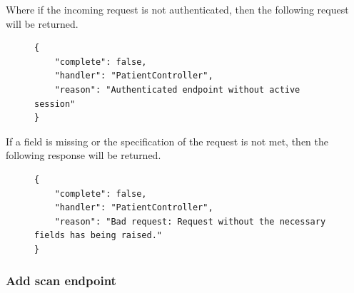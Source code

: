 					Where if the incoming request is not authenticated, then the following request will be returned.
					\begin{figure}[H]
						\iftrue
						\begin{lstlisting}[]
{
	"complete": false,
	"handler": "PatientController",
	"reason": "Authenticated endpoint without active session"
}
						\end{lstlisting}
					\end{figure}
					If a field is missing or the specification of the request is not met, then the following response will be returned.
					\begin{figure}[H]
						\iftrue
						\begin{lstlisting}[]
{
	"complete": false,
	"handler": "PatientController",
	"reason": "Bad request: Request without the necessary fields has being raised."
}					
						\end{lstlisting}
					\end{figure}
				\subsubsection{Add scan endpoint}
				
